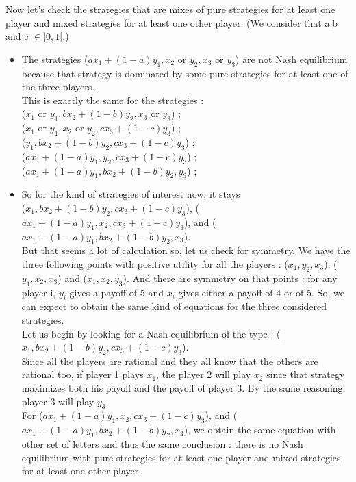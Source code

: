 Now let's check the strategies that are mixes of pure strategies for at least one player and mixed strategies for at least one other player. (We consider that a,b and c $\in ]0,1[$.)
\begin{itemize}
    \item {The strategies ($ax_1 + (1-a)y_1, x_2 \text{ or } y_2, x_3 
    \text{ or } y_3$) are not Nash equilibrium because that strategy is 
    dominated by some pure strategies for at least one of the three players.\\
    This is exactly the same for the strategies :\\
    ($x_1 \text{ or } y_1, bx_2 + (1-b)y_2, x_3 \text{ or } y_3 $) ;\\
    ($ x_1 \text{ or } y_1, x_2 \text{ or } y_2, c x_3 + (1-c) y_3$) ;\\
    ($y_1,  bx_2 + (1-b)y_2, c x_3 + (1-c)y_3 $) ; \\
    ($ax_1 + (1-a)y_1, y_2, c x_3 + (1-c) y_3 $) ; \\
    ($ax_1 + (1-a)y_1, bx_2 + (1-b)y_2, y_3$) ; \\    
    }
    \item {So for the kind of strategies of interest now, it stays \\
    ($x_1, bx_2 + (1-b)y_2, c x_3 + (1-c) y_3$), ($ax_1 + (1-a)y_1, x_2, c x_3 + (1-c) y_3 $), and ($ax_1 + (1-a)y_1, bx_2 + (1-b)y_2, x_3 $).\\
    But that seems a lot of calculation so, let us check for symmetry. We have the three following points with positive utility for all the players : ($x_1, y_2, x_3$), 
    ($y_1, x_2, x_3$) and ($x_1, x_2, y_3$). And there are symmetry on that points : for any player i, $y_i$ gives a payoff of 5 and $x_i$ gives either 
    a payoff of 4 or of 5. So, we can expect to obtain the same kind of equations for the three considered strategies.\\
    Let us begin by looking for a Nash equilibrium of the type :
    ($x_1, bx_2 + (1-b)y_2, c x_3 + (1-c) y_3$).\\
    Since all the players are rational and they all know that the others are rational too, if player 1 plays $x_1$, the player 2 will play $x_2$ since that strategy maximizes both his payoff and the payoff of player 3. By the same reasoning, player 3 will play $y_3$.\\
    For ($ax_1 + (1-a)y_1, x_2, c x_3 + (1-c) y_3 $), and ($ax_1 + (1-a)y_1, bx_2 + (1-b)y_2, x_3 $), we obtain the same equation with other set of letters and thus the same conclusion : there is no Nash equilibrium with pure strategies for at least one player and mixed strategies for at least one other player.
    }
\end{itemize}

